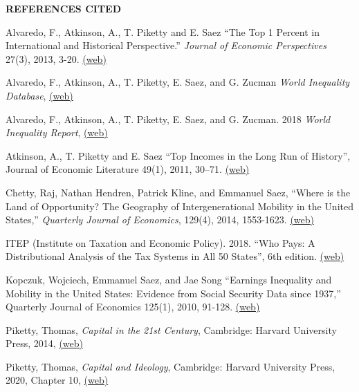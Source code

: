 \documentclass[landscape]{slides}
\begin{document}
\begin{slide}
\begin{center}
{\bf REFERENCES CITED}
\end{center}
{\small

Alvaredo, F., Atkinson, A., T. Piketty and E. Saez ``The Top 1 Percent in International and Historical Perspective.''  \emph{Journal of Economic Perspectives} 27(3), 2013, 3-20. \href{http://eml.berkeley.edu/~saez/alvaredo-atkinson-piketty-saezJEP13top1percent.pdf} {(web)}

Alvaredo, F., Atkinson, A., T. Piketty, E. Saez, and G. Zucman \emph{World Inequality Database},
\href{http://www.wid.world/} {(web)}

Alvaredo, F., Atkinson, A., T. Piketty, E. Saez, and G. Zucman. 2018 \emph{World Inequality Report},
\href{https://wir2018.wid.world/} {(web)}

Atkinson, A., T. Piketty and E. Saez ``Top Incomes in the Long Run of History'', Journal of Economic Literature
49(1), 2011, 30--71. \href{http://elsa.berkeley.edu/~saez/atkinson-piketty-saezJEL10.pdf} {(web)}

Chetty, Raj, Nathan Hendren, Patrick Kline, and Emmanuel Saez, ``Where is the Land of Opportunity? The Geography of Intergenerational Mobility in the United States,'' \emph{Quarterly Journal of Economics}, 129(4), 2014, 1553-1623.
\href{http://eml.berkeley.edu/~saez/chetty-friedman-kline-saezQJE14mobility.pdf}{(web)}

ITEP (Institute on Taxation and Economic Policy). 2018. ``Who Pays: A Distributional Analysis of the Tax Systems in All 50 States'', 6th edition. 
\href{https://itep.org/whopays/}{(web)}


Kopczuk, Wojciech, Emmanuel Saez, and Jae Song ``Earnings Inequality and Mobility in the United States: Evidence from Social Security Data since 1937,'' Quarterly Journal of Economics 125(1), 2010, 91-128. \href{http://www.econ.berkeley.edu/~saez/kopczuk-saez-songQJE10mobility.pdf} {(web)}

Piketty, Thomas, \emph{Capital in the 21st Century},  Cambridge: Harvard University Press, 2014,   
\href{http://piketty.pse.ens.fr/en/capital21c2}{(web)}

Piketty, Thomas, \emph{Capital and Ideology},  Cambridge: Harvard University Press, 2020,  Chapter 10,
\href{http://piketty.pse.ens.fr/en/ideology}{(web)}

}
\end{slide}
\end{document}
